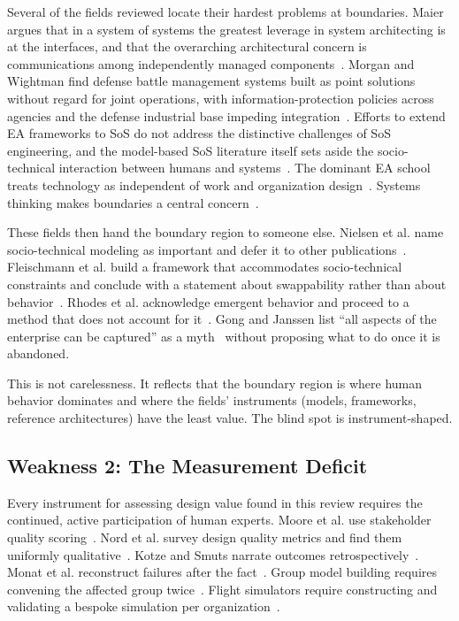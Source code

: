 \documentclass{csimq}
\begin{document}
Several of the fields reviewed locate their hardest problems at boundaries. Maier argues that in a system of systems the greatest leverage in system architecting is at the interfaces, and that the overarching architectural concern is communications among independently managed components~\cite{maier1998}. Morgan and Wightman find defense battle management systems built as point solutions without regard for joint operations, with information-protection policies across agencies and the defense industrial base impeding integration~\cite{morgan2023}. Efforts to extend EA frameworks to SoS do not address the distinctive challenges of SoS engineering, and the model-based SoS literature itself sets aside the socio-technical interaction between humans and systems~\cite{nielsen2015}. The dominant EA school treats technology as independent of work and organization design~\cite{lapalme2012}. Systems thinking makes boundaries a central concern~\cite{greene2017}.

These fields then hand the boundary region to someone else. Nielsen et
al. name socio-technical modeling as important and defer it to other
publications~\cite{nielsen2015}. Fleischmann et al. build a framework that
accommodates socio-technical constraints and conclude with a statement about
swappability rather than about behavior~\cite{fleischmann2016}. Rhodes et al.
acknowledge emergent behavior and proceed to a method that does not account for
it~\cite{rhodes2009}. Gong and Janssen list ``all aspects of the enterprise can
be captured'' as a myth~\cite{gong2019} without proposing what to do once it is
abandoned.

This is not carelessness. It reflects that the boundary region is where human
behavior dominates and where the fields' instruments (models, frameworks,
reference architectures) have the least value. The blind spot is
instrument-shaped.

\subsection{Weakness 2: The Measurement Deficit}

Every instrument for assessing design value found in this review requires the
continued, active participation of human experts. Moore et al. use stakeholder
quality scoring~\cite{moore2003}. Nord et al. survey design quality metrics and
find them uniformly qualitative~\cite{nord2014}. Kotze and Smuts narrate
outcomes retrospectively~\cite{kotze2016}. Monat et al. reconstruct failures
after the fact~\cite{monat2020}. Group model building requires convening the
affected group twice~\cite{hovmand2013,kunc2016}. Flight simulators require
constructing and validating a bespoke simulation per
organization~\cite{papageorgiou2008}.
\end{document}
